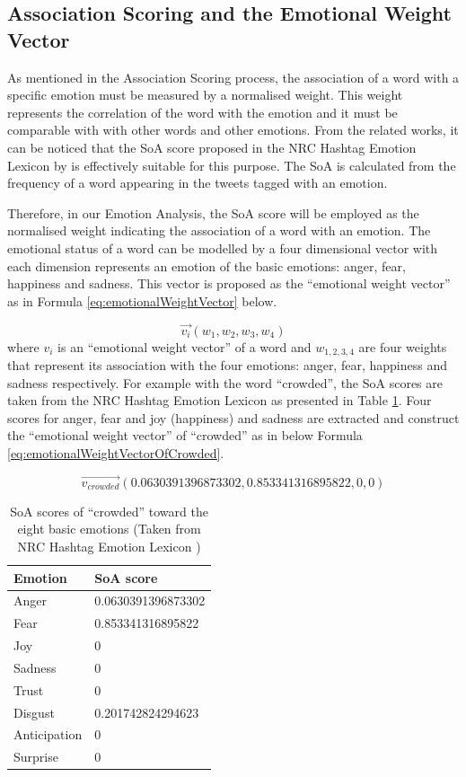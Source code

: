 \subsection{Association Scoring and the Emotional Weight Vector}
As mentioned in the Association Scoring process, the association of a word with a specific emotion must be measured by a normalised weight. This weight represents the correlation of the word with the emotion and it must be comparable with with other words and other emotions. From the related works, it can be noticed that the SoA score proposed in the NRC Hashtag Emotion Lexicon by \citet{mohammad2014using} is effectively suitable for this purpose. The SoA is calculated from the frequency of a word appearing in the tweets tagged with an emotion.

Therefore, in our Emotion Analysis, the SoA score will be employed as the normalised weight indicating the association of a word with an emotion. The emotional status of a word can be modelled by a four dimensional vector with each dimension represents an emotion of the basic emotions: anger, fear, happiness and sadness. This vector is proposed as the ``emotional weight vector'' as in Formula \ref{eq:emotionalWeightVector} below.

\begin{equation}
\label{eq:emotionalWeightVector}
	\vec{v_i}(w_1, w_2, w_3, w_4)
\end{equation}
where \(v_i\) is an ``emotional weight vector'' of a word and \(w_{1,2,3,4}\) are four weights that represent its association with the four emotions: anger, fear, happiness and sadness respectively. For example with the word ``crowded'', the SoA scores are taken from the NRC Hashtag Emotion Lexicon as presented in Table \ref{table:soaOfCrowded}. Four scores for anger, fear and joy (happiness) and sadness are extracted and construct the ``emotional weight vector'' of ``crowded'' as in below Formula \ref{eq:emotionalWeightVectorOfCrowded}.

\begin{equation}
\label{eq:emotionalWeightVectorOfCrowded}
	\vec{v_{crowded}}(0.0630391396873302, 0.853341316895822, 0, 0)
\end{equation}

\begin{table}
\caption{SoA scores of ``crowded'' toward the eight basic emotions (Taken from NRC Hashtag Emotion Lexicon \citep{mohammad2014using})}
\label{table:soaOfCrowded}
\centering
\begin{tabular}{|l|l|}
\hline
\textbf{Emotion} & \textbf{SoA score} \\ \hline \hline
Anger & 0.0630391396873302 \\ \hline
Fear & 0.853341316895822 \\ \hline
Joy & 0 \\ \hline
Sadness & 0 \\ \hline
Trust & 0 \\ \hline
Disgust & 0.201742824294623 \\ \hline
Anticipation & 0 \\ \hline
Surprise & 0 \\ \hline
\end{tabular}
\end{table}

